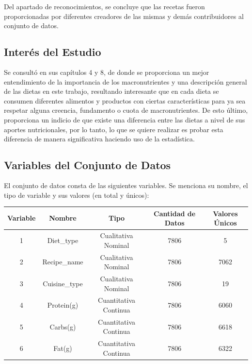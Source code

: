 \documentclass[12pt,a4paper]{article}
\begin{document}
        Del apartado de reconocimientos, se concluye que las recetas fueron 
        proporcionadas por diferentes creadores de las mismas y demás contribuidores 
        al conjunto de datos. 

    \subsection{Interés del Estudio}

        Se consultó \cite{marvastipopular} en sus 
        capítulos 4 y 8, de donde se proporciona un mejor entendimiento de la 
        importancia de los macronutrientes y una descripción general de las 
        dietas en este trabajo, resultando interesante que en cada dieta se 
        consumen diferentes alimentos y productos con ciertas características 
        para ya sea respetar alguna creencia, fundamento o cuota de macronutrientes. 
        De esto último, proporciona un indicio de que existe una diferencia entre 
        las dietas a nivel de sus aportes nutricionales, por lo tanto, lo que se 
        quiere realizar es probar esta diferencia de manera significativa haciendo 
        uso de la estadística.

    \subsection{Variables del Conjunto de Datos}

        El conjunto de datos consta de las siguientes variables. Se menciona su 
        nombre, el tipo de variable y sus valores (en total y únicos):

        \begin{center}
            \begin{tabular}{| c | c | c | c | c |}
                \toprule
                Variable & Nombre & Tipo & Cantidad de Datos & Valores Únicos\\
                \midrule
                1 & Diet\_type & Cualitativa Nominal & 7806 & 5 \\
                2 & Recipe\_name & Cualitativa Nominal & 7806 & 7062\\
                3 & Cuisine\_type & Cualitativa Nominal & 7806 & 19\\
                4 & Protein(g) & Cuantitativa Continua & 7806 & 6060\\
                5 & Carbs(g) & Cuantitativa Continua & 7806 & 6618\\
                6 & Fat(g) & Cuantitativa Continua & 7806 & 6322\\
                \bottomrule
            \end{tabular}
        \end{center}
\end{document}
